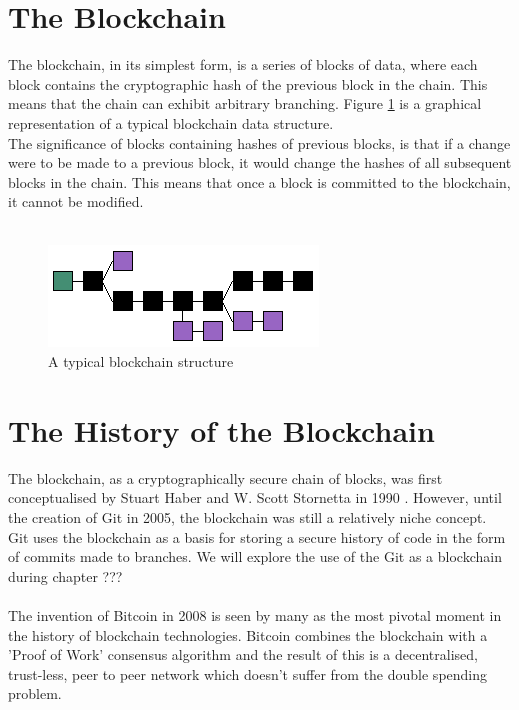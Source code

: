 \documentclass[12pt,a4paper,twoside,openright]{report}
\begin{document}

	\section{The Blockchain}
	
	The blockchain, in its simplest form, is a series of blocks of data, where each block contains the cryptographic hash of the previous block in the chain. This means that the chain can exhibit arbitrary branching. Figure \ref{fig:mainblockchain} is a graphical representation of a typical blockchain data structure.\\
	The significance of blocks containing hashes of previous blocks, is that if a change were to be made to a previous block, it would change the hashes of all subsequent blocks in the chain. This means that once a block is committed to the blockchain, it cannot be modified. \\
	\\
	\begin{figure}
		\includegraphics[width=\linewidth]{figs/blockchain}
		\caption{A typical blockchain structure}
		\label{fig:mainblockchain}
	\end{figure}
	
	\section{The History of the Blockchain}
	The blockchain, as a cryptographically secure chain of blocks, was first conceptualised by Stuart Haber and W. Scott Stornetta in 1990 \cite{HaberStornetta}.
	However, until the creation of Git \cite{Git} in 2005, the blockchain was still a relatively niche concept.\\
	Git uses the blockchain as a basis for storing a secure history of code in the form of commits made to branches.
	We will explore the use of the Git as a blockchain during chapter ??? \\
	\\
	The invention of Bitcoin\cite{Bitcoin} in 2008 is seen by many as the most pivotal moment in the history of blockchain technologies.
	Bitcoin combines the blockchain with a 'Proof of Work' consensus algorithm and the result of this is a decentralised, trust-less, peer to peer network which doesn't suffer from the double spending problem. \\
	\\
\end{document}
